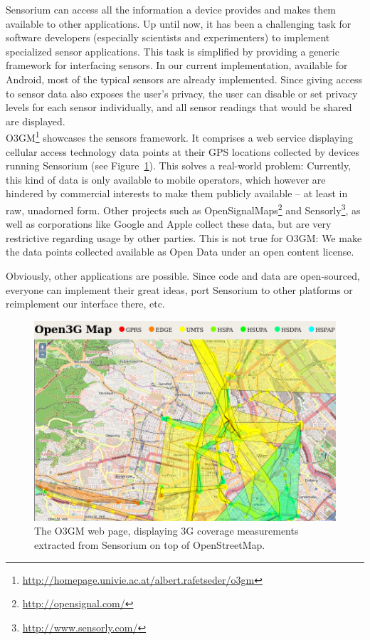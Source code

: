 Sensorium can access all the information a device provides and makes them available to other applications. Up until now, it has been a challenging task for software developers (especially scientists and experimenters) to implement specialized sensor applications. This task is simplified by providing a generic framework for interfacing sensors. In our current implementation, available for Android, most of the typical sensors are already implemented. Since giving access to sensor data also exposes the user's privacy, the user can disable or set privacy levels for each sensor individually, and all sensor readings that would be shared are displayed. %
\\

O3GM\footnote{\url{http://homepage.univie.ac.at/albert.rafetseder/o3gm}} showcases the sensors framework. It comprises a web service displaying cellular access technology data points at their GPS locations collected by devices running Sensorium (see Figure~\ref{c5:fig:ogggm}). This solves a real-world problem: Currently, this kind of data is only available to mobile operators, which however  are hindered by commercial interests to make them publicly available -- at least in raw, unadorned form. Other projects such as OpenSignalMaps\footnote{\url{http://opensignal.com/}} and Sensorly\footnote{\url{http://www.sensorly.com/}}, as well as corporations like Google and Apple collect these data, but are very restrictive regarding usage by other parties. This is not true for O3GM: We make the data points collected available as Open Data under an open content license.

Obviously, other applications are possible. Since code and data are open-sourced, everyone can implement their great ideas, port Sensorium to other platforms or reimplement our interface there, etc.

\begin{figure}[htbp]
\centering
\includegraphics[width=.98\columnwidth]{images/map-cells.png}
\caption{\small The O3GM web page, displaying 3G coverage measurements extracted from Sensorium on top of OpenStreetMap.}
\label{c5:fig:ogggm}
\end{figure}


